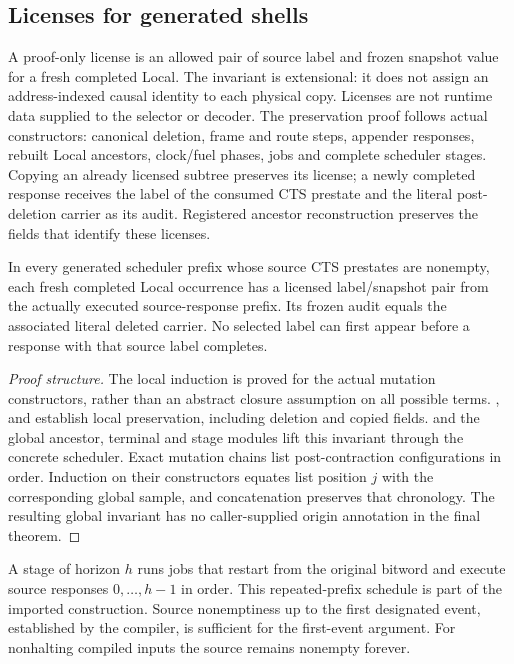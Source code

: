 \subsection{Licenses for generated shells}
A proof-only license is an allowed pair of source label and frozen snapshot
value for a fresh completed Local. The invariant is extensional: it does not
assign an address-indexed causal identity to each physical copy. Licenses are
not runtime data supplied to the selector or decoder. The preservation proof follows actual constructors:
canonical deletion, frame and route steps, appender responses, rebuilt Local
ancestors, clock/fuel phases, jobs and complete scheduler stages. Copying an
already licensed subtree preserves its license; a newly completed response
receives the label of the consumed CTS prestate and the literal post-deletion
carrier as its audit. Registered ancestor reconstruction preserves the fields
that identify these licenses.

\begin{lemma}\label{lem:origins}
In every generated scheduler prefix whose source CTS prestates are nonempty,
each fresh completed Local occurrence has a licensed label/snapshot pair
from the actually executed source-response prefix. Its frozen audit equals
the associated literal deleted carrier. No selected label can first appear before a response
with that source label completes.
\end{lemma}

\begin{proof}[Proof structure]
The local induction is proved for the actual mutation constructors, rather
than an abstract closure assumption on all possible terms.
,  and
 establish local preservation, including deletion
and copied fields.  and the global ancestor,
terminal and stage modules lift this invariant through the concrete scheduler.
Exact mutation chains list post-contraction configurations in order. Induction
on their constructors equates list position $j$ with the corresponding global
sample, and concatenation preserves that chronology. The resulting global
invariant has no caller-supplied origin annotation in the final theorem.
\end{proof}

A stage of horizon $h$ runs jobs that restart from the original bitword and
execute source responses $0,\ldots,h-1$ in order. This repeated-prefix schedule
is part of the imported construction. Source nonemptiness up to the first
designated event, established by the compiler, is sufficient for the first-event
argument. For nonhalting compiled inputs the source remains nonempty forever.

